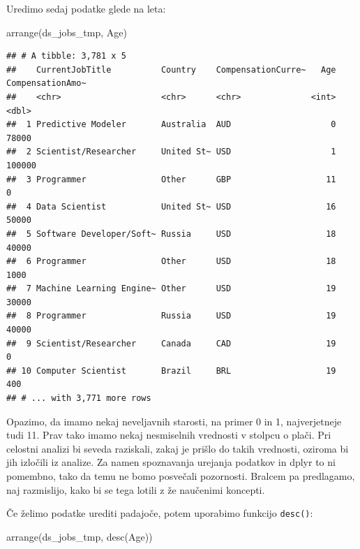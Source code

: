 \documentclass[
]{book}
\newenvironment{Shaded}{\begin{snugshade}}{\end{snugshade}}
\newcommand{\FunctionTok}[1]{\textcolor[rgb]{0.00,0.00,0.00}{#1}}
\newcommand{\NormalTok}[1]{#1}
\begin{document}
Uredimo sedaj podatke glede na leta:

\begin{Shaded}
\begin{Highlighting}[]
\FunctionTok{arrange}\NormalTok{(ds\_jobs\_tmp, Age)}
\end{Highlighting}
\end{Shaded}

\begin{verbatim}
## # A tibble: 3,781 x 5
##    CurrentJobTitle          Country    CompensationCurre~   Age CompensationAmo~
##    <chr>                    <chr>      <chr>              <int>            <dbl>
##  1 Predictive Modeler       Australia  AUD                    0            78000
##  2 Scientist/Researcher     United St~ USD                    1           100000
##  3 Programmer               Other      GBP                   11                0
##  4 Data Scientist           United St~ USD                   16            50000
##  5 Software Developer/Soft~ Russia     USD                   18            40000
##  6 Programmer               Other      USD                   18             1000
##  7 Machine Learning Engine~ Other      USD                   19            30000
##  8 Programmer               Russia     USD                   19            40000
##  9 Scientist/Researcher     Canada     CAD                   19                0
## 10 Computer Scientist       Brazil     BRL                   19              400
## # ... with 3,771 more rows
\end{verbatim}

Opazimo, da imamo nekaj neveljavnih starosti, na primer 0 in 1, najverjetneje tudi 11. Prav tako imamo nekaj nesmiselnih vrednosti v stolpcu o plači. Pri celostni analizi bi seveda raziskali, zakaj je prišlo do takih vrednosti, oziroma bi jih izločili iz analize. Za namen spoznavanja urejanja podatkov in dplyr to ni pomembno, tako da temu ne bomo posvečali pozornosti. Bralcem pa predlagamo, naj razmislijo, kako bi se tega lotili z že naučenimi koncepti.

Če želimo podatke urediti padajoče, potem uporabimo funkcijo \texttt{desc()}:

\begin{Shaded}
\begin{Highlighting}[]
\FunctionTok{arrange}\NormalTok{(ds\_jobs\_tmp, }\FunctionTok{desc}\NormalTok{(Age))}
\end{Highlighting}
\end{Shaded}
\end{document}
